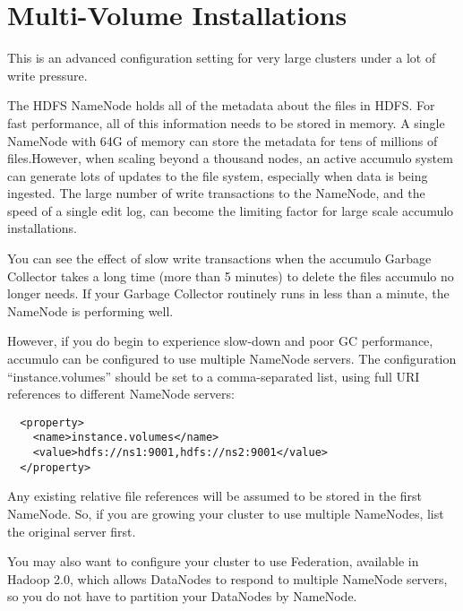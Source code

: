 
%
%

\chapter{Multi-Volume Installations}

This is an advanced configuration setting for very large clusters
under a lot of write pressure.

The HDFS NameNode holds all of the metadata about the files in
HDFS. For fast performance, all of this information needs to be stored
in memory.  A single NameNode with 64G of memory can store the
metadata for tens of millions of files.However, when scaling beyond a
thousand nodes, an active accumulo system can generate lots of updates
to the file system, especially when data is being ingested.  The large
number of write transactions to the NameNode, and the speed of a
single edit log, can become the limiting factor for large scale
accumulo installations.

You can see the effect of slow write transactions when the accumulo
Garbage Collector takes a long time (more than 5 minutes) to delete
the files accumulo no longer needs.  If your Garbage Collector
routinely runs in less than a minute, the NameNode is performing well.

However, if you do begin to experience slow-down and poor GC
performance, accumulo can be configured to use multiple NameNode
servers.  The configuration ``instance.volumes'' should be set to a
comma-separated list, using full URI references to different NameNode
servers:

\small
\begin{verbatim}
  <property>
    <name>instance.volumes</name>
    <value>hdfs://ns1:9001,hdfs://ns2:9001</value>
  </property>
\end{verbatim}
\normalsize

Any existing relative file references will be assumed to be stored in
the first NameNode.  So, if you are growing your cluster to use
multiple NameNodes, list the original server first.

You may also want to configure your cluster to use Federation,
available in Hadoop 2.0, which allows DataNodes to respond to multiple
NameNode servers, so you do not have to partition your DataNodes by
NameNode.
